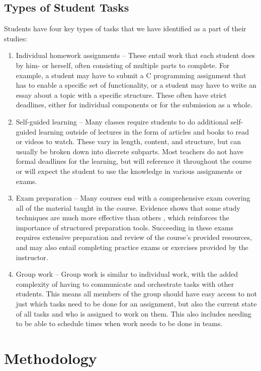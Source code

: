 \documentclass[11pt,oneside]{article}
\begin{document}
\subsection{Types of Student Tasks}
Students have four key types of tasks that we have identified as a part of their studies: 

\begin{enumerate}
\item Individual homework assignments – These entail work that each student does by him- or herself, often consisting of multiple parts to complete. For example, a student may have to submit a C programming assignment that has to enable a specific set of functionality, or a student may have to write an essay about a topic with a specific structure. These often have strict deadlines, either for individual components or for the submission as a whole.
\item Self-guided learning – Many classes require students to do additional self-guided learning outside of lectures in the form of articles and books to read or videos to watch. These vary in length, content, and structure, but can usually be broken down into discrete subparts. Most teachers do not have formal deadlines for the learning, but will reference it throughout the course or will expect the student to use the knowledge in various assignments or exams.
\item Exam preparation – Many courses end with a comprehensive exam covering all of the material taught in the course. Evidence shows that some study techniques are much more effective than others \citep{dunlosky2013improving}, which reinforces the importance of structured preparation tools. Succeeding in these exams requires extensive preparation and review of the course’s provided resources, and may also entail completing practice exams or exercises provided by the instructor.
\item Group work – Group work is similar to individual work, with the added complexity of having to communicate and orchestrate tasks with other students. This means all members of the group should have easy access to not just which tasks need to be done for an assignment, but also the current state of all tasks and who is assigned to work on them. This also includes needing to be able to schedule times when work needs to be done in teams.
\end{enumerate}



\section{Methodology}
\end{document}
